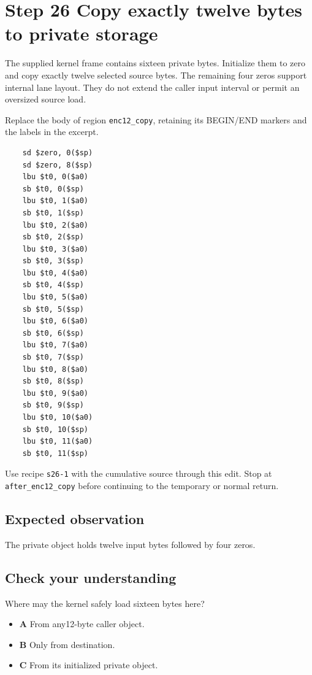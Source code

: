 \section{Step 26 Copy exactly twelve bytes to private storage}\label{base64-s26}

The supplied kernel frame contains sixteen private bytes. Initialize them to zero and copy exactly twelve selected source bytes. The remaining four zeros support internal lane layout. They do not extend the caller input interval or permit an oversized source load.

Replace the body of region \texttt{enc12\_copy}, retaining its BEGIN/END markers and the labels in the excerpt.

\begin{verbatim}
    sd $zero, 0($sp)
    sd $zero, 8($sp)
    lbu $t0, 0($a0)
    sb $t0, 0($sp)
    lbu $t0, 1($a0)
    sb $t0, 1($sp)
    lbu $t0, 2($a0)
    sb $t0, 2($sp)
    lbu $t0, 3($a0)
    sb $t0, 3($sp)
    lbu $t0, 4($a0)
    sb $t0, 4($sp)
    lbu $t0, 5($a0)
    sb $t0, 5($sp)
    lbu $t0, 6($a0)
    sb $t0, 6($sp)
    lbu $t0, 7($a0)
    sb $t0, 7($sp)
    lbu $t0, 8($a0)
    sb $t0, 8($sp)
    lbu $t0, 9($a0)
    sb $t0, 9($sp)
    lbu $t0, 10($a0)
    sb $t0, 10($sp)
    lbu $t0, 11($a0)
    sb $t0, 11($sp)
\end{verbatim}

Use recipe \texttt{s26-1} with the cumulative source through this edit. Stop at \texttt{after\_enc12\_copy} before continuing to the temporary or normal return.

\subsection{Expected observation}
The private object holds twelve input bytes followed by four zeros.

\subsection{Check your understanding}
Where may the kernel safely load sixteen bytes here?

\begin{itemize}
\item \textbf{A} From any12-byte caller object.
\item \textbf{B} Only from destination.
\item \textbf{C} From its initialized private object.
\end{itemize}
